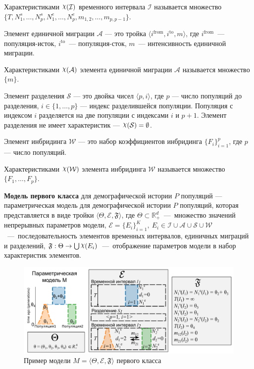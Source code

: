 Характеристиками $\rchi(\mathcal{I})$ временного интервала $\mathcal{I}$ называется множество
$\{T, N^s_1, \ldots,N^s_p, N^e_1, \ldots,N^e_p, m_{1,2},\ldots, m_{p, p-1}\}$.

 Элемент единичной миграции $\mathcal{A}$ --- это тройка ${\langle i^\text{from}, i^\text{to}, m \rangle}$, где $i^\text{from}$~--- популяция-исток, $i^\text{to}$~--- популяция-сток, $m$~--- интенсивность единичной миграции.

 Характеристиками $\rchi(\mathcal{A})$ элемента единичной миграции $\mathcal{A}$ называется множество
$\{m\}$.

 Элемент разделения $\mathcal{S}$ --- это двойка чисел $\langle p, i \rangle$, где $p$ --- число популяций до разделения, $i \in \{1, \ldots, p\}$ --- индекс разделившейся популяции.
Популяция с индексом $i$ разделяется на две популяции с индексами $i$ и $p+1$.
Элемент разделения не имеет характеристик --- $\rchi(\mathcal{S}) = \emptyset$.

 Элемент инбридинга $\mathcal{W}$ --- это набор коэффициентов инбридинга $\{F_i\}_{i=1}^p$, где $p$ --- число популяций.

 Характеристиками $\rchi(\mathcal{W})$ элемента инбридинга $\mathcal{W}$ называется множество
$\{F_1, \ldots, F_p\}$.

 \textbf{Модель первого класса} для демографической истории $P$ популяций --- параметрическая модель для демографической истории $P$ популяций, которая представляется в виде тройки $\langle \Theta, \mathcal{E}, \mathfrak{F}\rangle$, где $\Theta \subset \mathbb{R}_+^d$~---~множество значений непрерывных параметров модели, $\mathcal{E} = \{E_i\}_{i=1}^K,\ E_i \in \mathcal{I} \cup \mathcal{A} \cup \mathcal{S} \cup \mathcal{W}$~---~последовательность элементов временных интервалов, единичных миграций и разделений, $\mathfrak{F}: \Theta \to  \bigcup \rchi(E_i)$~---~отображение параметров модели в набор характеристик элементов.

\begin{figure}[b]
    \centering
    \includegraphics[width=\textwidth]{images_2/model_1_type.pdf}
    \caption{Пример модели $M = \langle \Theta, \mathcal{E}, \mathfrak{F}\rangle$ первого класса}
    \label{fig:model_1_type}
\end{figure}

